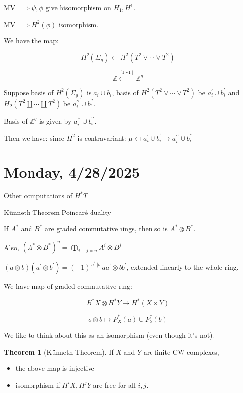 \documentclass{article}
\theoremstyle{definition}
\newtheorem{theorem}{Theorem}
\begin{document}
    MV \(\implies \psi , \phi\) give hisomorphism on \(H_1, H^1\).

    MV \(\implies H^2(\phi)\) isomorphism.

    We have the map:

    \[
        H^2(\Sigma_g) \leftarrow H^2(T^2 \vee \cdots \vee T^2)
    \]

    \[
        \mathbb{Z} \xleftarrow{[1 \cdots 1]} \mathbb{Z}^g
    \]

    Suppose basis of \(H^2(\Sigma_g)\) is \(a_i \cup b_i\), basis of \(H^2(T^2 \vee \cdots \vee T^2)\) be \(a_i ^{\prime} \cup b_i^{\prime}\)
    and \(H_2(T^2 \coprod \cdots \coprod T^2)\) be \(a_i^{\prime\prime}\cup b_i^{\prime\prime}\).
    
    Basis of \(\mathbb{Z}^g\) is given by \(a_i ^{\prime\prime} \cup b_i^{\prime\prime}\).

    Then we have: since \(H^2\) is contravariant: \(\mu \mapsfrom a_i^{\prime} \cup b_i^{\prime} \mapsto a_i ^{\prime\prime} \cup b_i^{\prime\prime}\)

    \section*{Monday, 4/28/2025}
    
    Other computations of \(H^{\ast} T\) 

    K\"unneth Theorem
    Poincar\'e duality

    If \(A^{\ast}\) and \(B^{\ast}\) are graded commutative rings, then so is \(A^{\ast} \otimes B^{\ast}\).

    Also, \((A^{\ast} \otimes B^{\ast})^n = \bigoplus_{i+j = n} A^i \otimes B^j\).

    \((a \otimes b)(a^{\prime} \otimes b^{\prime}) =(-1)^{\vert a^{\prime} \vert \vert b \vert} aa^{\prime} \otimes b b^{\prime}\), extended linearly to the whole ring.

    We have map of graded commutative ring:

    \[
        H^{\ast} X \otimes H^{\ast} Y \to H^{\ast} (X \times Y)
    \]

    \[
        a \otimes b \mapsto P_X^{\ast} (a) \cup P_Y^{\ast} (b)
    \]

    We like to think about this as an isomorphism (even though it's not).

    \begin{theorem}
        [K\"unneth Theorem] If \(X\) and \(Y\) are finite CW complexes,

        \begin{itemize}
            \item the above map is injective
            \item isomorphism if \(H^i X, H^j Y\) are free for all \(i,j\). 
        \end{itemize} 
    \end{theorem}
\end{document}
